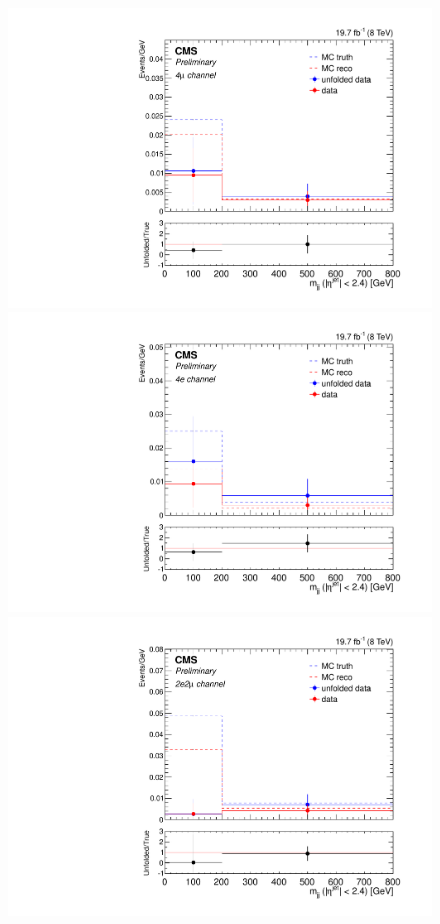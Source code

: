 \begin{figure}[hbtp]
  \begin{center}
    \includegraphics[width=\cmsFigWidth]{Figures/CentralMjj_ZZTo4m_Mad_fr_binwidth}
    \includegraphics[width=\cmsFigWidth]{Figures/CentralMjj_ZZTo4e_Mad_fr_binwidth}
    \includegraphics[width=\cmsFigWidth]{Figures/CentralMjj_ZZTo2e2m_Mad_fr_binwidth}   

\end{center}
\end{figure}

